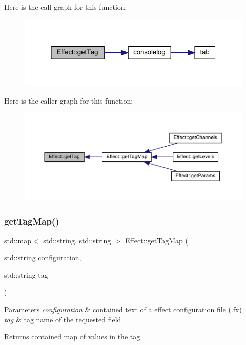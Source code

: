 Here is the call graph for this function\+:
\nopagebreak
\begin{figure}[H]
\begin{center}
\leavevmode
\includegraphics[width=325pt]{class_effect_a607ab2a63d333137c1f07cf03611c4bf_cgraph}
\end{center}
\end{figure}
Here is the caller graph for this function\+:
\nopagebreak
\begin{figure}[H]
\begin{center}
\leavevmode
\includegraphics[width=350pt]{class_effect_a607ab2a63d333137c1f07cf03611c4bf_icgraph}
\end{center}
\end{figure}
\mbox{\label{class_effect_a616281286b866f1f8f6c66715e54ee89}} 
\subsubsection{\texorpdfstring{get\+Tag\+Map()}{getTagMap()}}
{\footnotesize\ttfamily std\+::map$<$ std\+::string, std\+::string $>$ Effect\+::get\+Tag\+Map (\begin{DoxyParamCaption}\item[{std\+::string}]{configuration,  }\item[{std\+::string}]{tag }\end{DoxyParamCaption})\hspace{0.3cm}{\ttfamily [static]}}


\begin{DoxyParams}{Parameters}
{\em configuration} & contained text of a effect configuration file (.fx) \\
\hline
{\em tag} & tag name of the requested field \\
\hline
\end{DoxyParams}
\begin{DoxyReturn}{Returns}
contained map of values in the tag 
\end{DoxyReturn}


